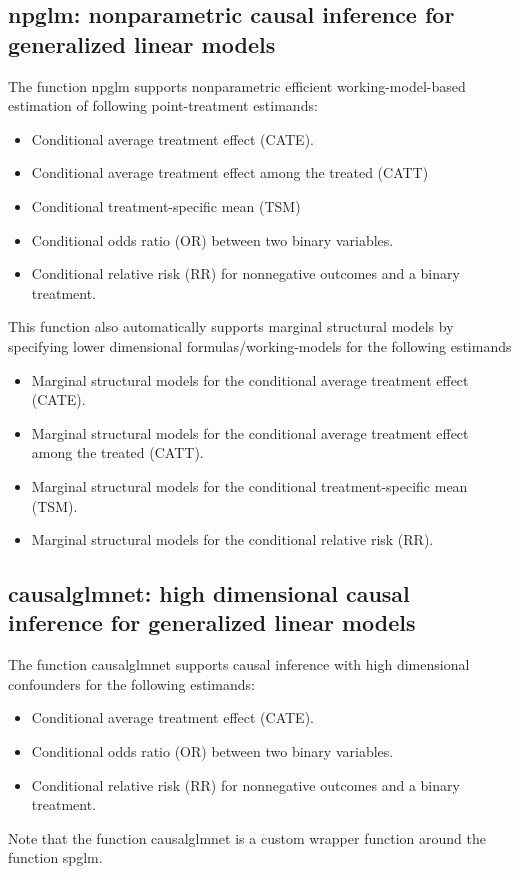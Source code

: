 \documentclass{article}
\begin{document}
\subsection{npglm: nonparametric causal inference for generalized linear models}

The function npglm supports nonparametric efficient working-model-based estimation of following point-treatment estimands:

\begin{itemize}
\item Conditional average treatment effect (CATE).
\item Conditional average treatment effect among the treated (CATT)
\item Conditional treatment-specific mean (TSM)
\item Conditional odds ratio (OR) between two binary variables. 
\item Conditional relative risk (RR) for nonnegative outcomes and a binary treatment.  
\end{itemize}

This function also automatically supports marginal structural models by specifying lower dimensional formulas/working-models for the following estimands
\begin{itemize}
\item Marginal structural models for the conditional average treatment effect (CATE).
\item Marginal structural models for the conditional average treatment effect among the treated (CATT).
\item Marginal structural models for the conditional treatment-specific mean (TSM).
\item Marginal structural models for the conditional relative risk (RR). 
\end{itemize}


\subsection{causalglmnet: high dimensional causal inference for generalized linear models}
The function causalglmnet supports causal inference with high dimensional confounders for the following estimands:
\begin{itemize}
\item Conditional average treatment effect (CATE). 
\item Conditional odds ratio (OR) between two binary variables. 
\item Conditional relative risk (RR) for nonnegative outcomes and a binary treatment.  
\end{itemize}
Note that the function causalglmnet is a custom wrapper function around the function spglm.
\end{document}

